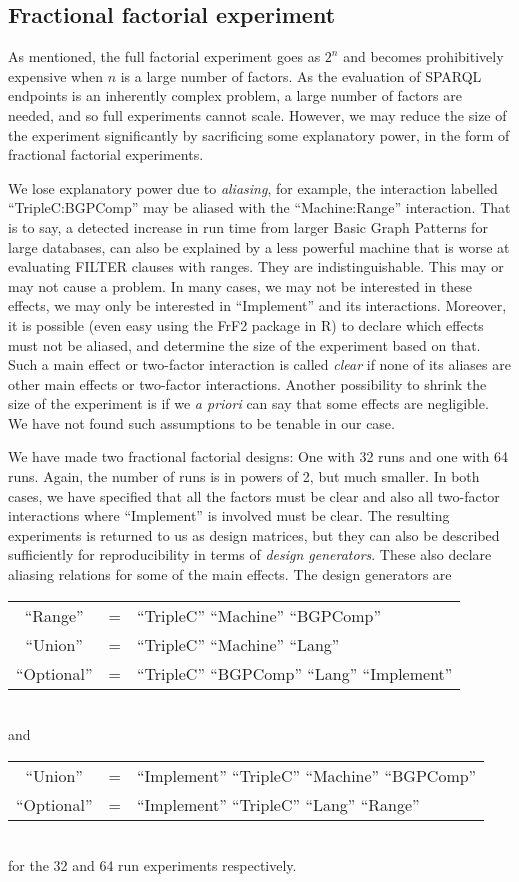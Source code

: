 \documentclass{llncs}
\begin{document}
\subsection{Fractional factorial experiment}\label{sec:frac}

As mentioned, the full factorial experiment goes as $2^n$ and becomes
prohibitively expensive when $n$ is a large number of factors. As the
evaluation of SPARQL endpoints is an inherently complex problem, a
large number of factors are needed, and so full experiments cannot
scale. However, we may reduce the size of the experiment significantly
by sacrificing some explanatory power, in the form of fractional
factorial experiments.

We lose explanatory power due to \emph{aliasing}, for example, the
interaction labelled ``TripleC:BGPComp'' may be aliased with the
``Machine:Range'' interaction. That is to say, a detected increase in
run time from larger Basic Graph Patterns for large databases, can
also be explained by a less powerful machine that is worse at
evaluating FILTER clauses with ranges. They are
indistinguishable. This may or may not cause a problem. In many cases,
we may not be interested in these effects, we may only be interested
in ``Implement'' and its interactions. Moreover, it is possible (even
easy using the FrF2 package in R) to declare which effects must not be
aliased, and determine the size of the experiment based on that. Such
a main effect or two-factor interaction is called \emph{clear} if none
of its aliases are other main effects or two-factor
interactions. Another possibility to shrink the size of the experiment
is if we \textit{a priori} can say that some effects are
negligible. We have not found such assumptions to be tenable in our
case.

We have made two fractional factorial designs: One with 32 runs and
one with 64 runs. Again, the number of runs is in powers of 2, but
much smaller. In both cases, we have specified that all the factors
must be clear and also all two-factor interactions where ``Implement''
is involved must be clear. The resulting experiments is returned to us
as design matrices, but they can also be described sufficiently for
reproducibility in terms of \emph{design generators}. These also
declare aliasing relations for some of the main effects. The design
generators are\\
\begin{tabular}{ccl}
``Range'' &=& ``TripleC'' ``Machine'' ``BGPComp'' \\  
``Union'' &=& ``TripleC'' ``Machine'' ``Lang'' \\  
``Optional'' &=& ``TripleC'' ``BGPComp'' ``Lang'' ``Implement'' 
\end{tabular}
\\and\\
\begin{tabular}{ccl}
``Union'' &=& ``Implement''  ``TripleC''  ``Machine'' ``BGPComp'' \\
``Optional'' &=& ``Implement''  ``TripleC'' ``Lang''  ``Range'' 
\end{tabular}
\\for the 32 and 64 run experiments respectively.
\end{document}
